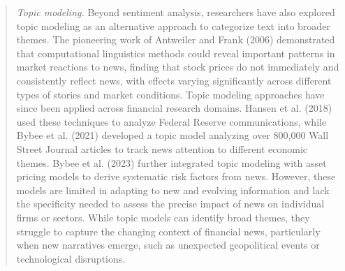 \begin{quote}
\hspace{0.5cm} \textit{Topic modeling.} 
Beyond sentiment analysis, researchers have also explored topic modeling as an alternative approach to categorize text into broader themes. The pioneering work of 
\cite{antweiler2006us}  Antweiler and Frank (2006) 
demonstrated that computational linguistics methods could reveal important patterns in market reactions to news, finding that stock prices do not immediately and consistently reflect news, with effects varying significantly across different types of stories and market conditions. Topic modeling approaches have since been applied across financial research domains. 
\cite{hansen2018transparency}  Hansen et al. (2018) 
used these techniques to analyze Federal Reserve communications, while 
\cite{bybee2021business}  Bybee et al. (2021) 
developed a topic model analyzing over 800,000 Wall Street Journal articles to track news attention to different economic themes. 
\cite{bybee2023narrative}  Bybee et al. (2023) 
further integrated topic modeling with asset pricing models to derive systematic risk factors from news.
%
However, these models are limited in adapting to new and evolving information and lack the specificity needed to assess the precise impact of news on individual firms or sectors. While topic models can identify broad themes, they struggle to capture the changing context of financial news, particularly when new narratives emerge, such as unexpected geopolitical events or technological disruptions.


\end{quote}

